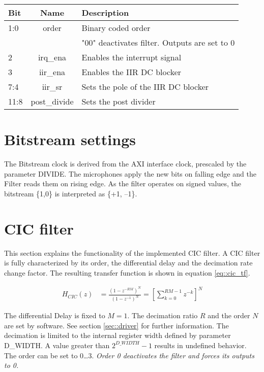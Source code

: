 \begin{table}[h]
	\centering
	\label{tbl::status_register}
	\begin{tabular}{|l|c|l|}
		\hline 
		Bit		& Name 	& Description \\
		\hline 
		1:0		& order	& Binary coded order \\
				& 		& "00" deactivates filter. Outputs are set to 0 \\
		\hline 
		2 		& irq\_ena	& Enables the interrupt signal\\
		\hline 
		3		& iir\_ena	& Enables the IIR DC blocker \\
		\hline 
		7:4		& iir\_sr	& Sets the pole of the IIR DC blocker \\
		\hline 
		11:8	& post\_divide & Sets the post divider \\
		\hline 
	\end{tabular} 
\end{table}

\section{Bitstream settings}
\label{sec::bitstream}
The Bitstream clock is derived from the AXI interface clock, prescaled by the parameter DIVIDE.
The microphones apply the new bits on falling edge and the Filter reads them on rising edge.
As the filter operates on signed values, the bitstream \{1,0\} is interpreted as \{+1, --1\}.

\section{CIC filter}
\label{sec::cic}

This section explains the functionality of the implemented CIC filter.
A CIC filter is fully characterized by its order, the differential delay and the decimation rate change factor.
The resulting transfer function is shown in equation \ref{eq::cic_tf}.

\begin{align}
	H_{CIC}(z) &= \frac{\left(1-z^{-RM}\right)^N}{\left(1-z^{-1}\right)^N} = \left[\sum_{k=0}^{RM-1}z^{-k}\right]^N\label{eq::cic_tf}
\end{align}

The differential Delay is fixed to $M=1$.
The decimation ratio $R$ and the order $N$ are set by software.
See section \ref{sec::driver} for further information.
The decimation is limited to the internal register width defined by parameter D\_WIDTH.
A value greater than $2^{D\_WIDTH} - 1$ results in undefined behavior.
The order can be set to 0\ldots3.
\emph{Order 0 deactivates the filter and forces its outputs to 0.}

